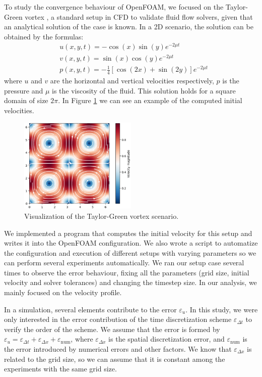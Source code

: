 \documentclass[
  english,        %
  font=times,     %
  onecolumn,      %
]{tumarticle}
\begin{document}
To study the convergence behaviour of OpenFOAM, we focused on the Taylor-Green vortex \cite{taylor1937mechanism, chorin1968numerical}, a standard setup in CFD to validate fluid flow solvers, given that an analytical solution of the case is known. In a 2D scenario, the solution can be obtained by the formulas:
\begin{align}
    &u(x, y, t) = -\cos(x) \sin(y) e^{-2\mu t} \\
    &v(x, y, t) = \sin(x) \cos(y) e^{-2\mu t} \\
    &p(x, y, t) = -\frac{1}{4}\left[\cos(2x) + \sin(2y)\right]e^{-2\mu t}
\end{align}
where $u$ and $v$ are the horizontal and vertical velocities respectively, $p$ is the pressure and $\mu$ is the viscosity of the fluid. This solution holds for a square domain of size $2\pi$. In Figure \ref{fig:taylor-green} we can see an example of the computed initial velocities. 

\begin{figure}[!ht]
    \centering
    \includegraphics[width=0.5\textwidth]{resources/taylor-green-vortex.png}
    \caption{Visualization of the Taylor-Green vortex scenario.}
    \label{fig:taylor-green}
\end{figure}

We implemented a program that computes the initial velocity for this setup and writes it into the OpenFOAM configuration. We also wrote a script to automatize the configuration and execution of different setups with varying parameters so we can perform several experiments automatically.
We ran our setup case several times to observe the error behaviour, fixing all the parameters (grid size, initial velocity and solver tolerances) and changing the timestep size. In our analysis, we mainly focused on the velocity profile.

In a simulation, several elements contribute to the error $\varepsilon_{u}$. In this study, we were only interested in the error contribution of the time discretization scheme $\varepsilon_{\Delta t}$ to verify the order of the scheme. We assume that the error is formed by $\varepsilon_u = \varepsilon_{\Delta t} + \varepsilon_{\Delta x} + \varepsilon_\text{num}$, where $\varepsilon_{\Delta x}$ is the spatial discretization error, and $\varepsilon_\text{num}$ is the error introduced by numerical errors and other factors. We know that $\varepsilon_{\Delta x}$ is related to the grid size, so we can assume that it is constant among the experiments with the same grid size.
\end{document}
